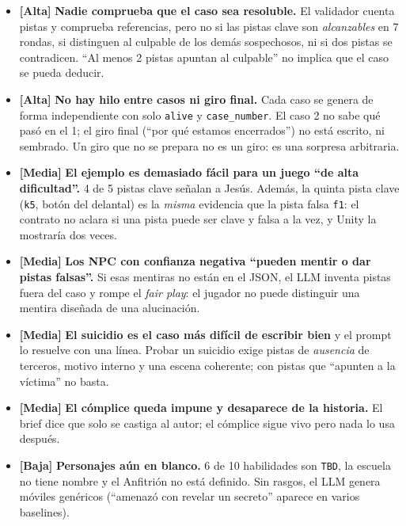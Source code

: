 \documentclass[11pt,a4paper]{article}
\newcommand{\prio}[1]{\textbf{\color{neon}[#1]}}
\begin{document}
\begin{debil}
\begin{itemize}
\item \prio{Alta} \textbf{Nadie comprueba que el caso sea resoluble.} El validador cuenta pistas y
comprueba referencias, pero no si las pistas clave son \emph{alcanzables} en 7 rondas, si distinguen
al culpable de los demás sospechosos, ni si dos pistas se contradicen. ``Al menos 2 pistas apuntan al
culpable'' no implica que el caso se pueda deducir.
\item \prio{Alta} \textbf{No hay hilo entre casos ni giro final.} Cada caso se genera de forma
independiente con solo \texttt{alive} y \texttt{case\_number}. El caso 2 no sabe qué pasó en el 1;
el giro final (``por qué estamos encerrados'') no está escrito, ni sembrado. Un giro que no se
prepara no es un giro: es una sorpresa arbitraria.
\item \prio{Media} \textbf{El ejemplo es demasiado fácil para un juego ``de alta dificultad''.}
4 de 5 pistas clave señalan a Jesús. Además, la quinta pista clave (\texttt{k5}, botón del delantal)
es la \emph{misma} evidencia que la pista falsa \texttt{f1}: el contrato no aclara si una pista
puede ser clave y falsa a la vez, y Unity la mostraría dos veces.
\item \prio{Media} \textbf{Los NPC con confianza negativa ``pueden mentir o dar pistas falsas''.}
Si esas mentiras no están en el JSON, el LLM inventa pistas fuera del caso y rompe el
\emph{fair play}: el jugador no puede distinguir una mentira diseñada de una alucinación.
\item \prio{Media} \textbf{El suicidio es el caso más difícil de escribir bien} y el prompt lo
resuelve con una línea. Probar un suicidio exige pistas de \emph{ausencia} de terceros, motivo
interno y una escena coherente; con pistas que ``apunten a la víctima'' no basta.
\item \prio{Media} \textbf{El cómplice queda impune y desaparece de la historia.} El brief dice que
solo se castiga al autor; el cómplice sigue vivo pero nada lo usa después.
\item \prio{Baja} \textbf{Personajes aún en blanco.} 6 de 10 habilidades son \texttt{TBD}, la
escuela no tiene nombre y el Anfitrión no está definido. Sin rasgos, el LLM genera móviles genéricos
(``amenazó con revelar un secreto'' aparece en varios baselines).
\end{itemize}
\end{debil}
\end{document}
